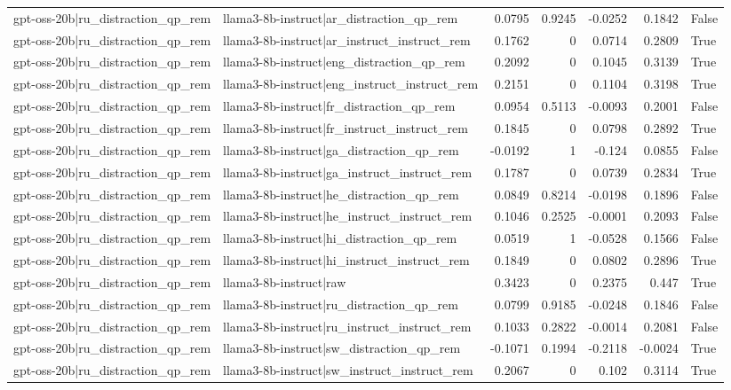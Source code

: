 \begin{table}
\begin{tabular}{l l r r r r l}
gpt-oss-20b|ru_distraction_qp_rem & llama3-8b-instruct|ar_distraction_qp_rem & 0.0795 & 0.9245 & -0.0252 & 0.1842 & False \\
gpt-oss-20b|ru_distraction_qp_rem & llama3-8b-instruct|ar_instruct_instruct_rem & 0.1762 & 0 & 0.0714 & 0.2809 & True \\
gpt-oss-20b|ru_distraction_qp_rem & llama3-8b-instruct|eng_distraction_qp_rem & 0.2092 & 0 & 0.1045 & 0.3139 & True \\
gpt-oss-20b|ru_distraction_qp_rem & llama3-8b-instruct|eng_instruct_instruct_rem & 0.2151 & 0 & 0.1104 & 0.3198 & True \\
gpt-oss-20b|ru_distraction_qp_rem & llama3-8b-instruct|fr_distraction_qp_rem & 0.0954 & 0.5113 & -0.0093 & 0.2001 & False \\
gpt-oss-20b|ru_distraction_qp_rem & llama3-8b-instruct|fr_instruct_instruct_rem & 0.1845 & 0 & 0.0798 & 0.2892 & True \\
gpt-oss-20b|ru_distraction_qp_rem & llama3-8b-instruct|ga_distraction_qp_rem & -0.0192 & 1 & -0.124 & 0.0855 & False \\
gpt-oss-20b|ru_distraction_qp_rem & llama3-8b-instruct|ga_instruct_instruct_rem & 0.1787 & 0 & 0.0739 & 0.2834 & True \\
gpt-oss-20b|ru_distraction_qp_rem & llama3-8b-instruct|he_distraction_qp_rem & 0.0849 & 0.8214 & -0.0198 & 0.1896 & False \\
gpt-oss-20b|ru_distraction_qp_rem & llama3-8b-instruct|he_instruct_instruct_rem & 0.1046 & 0.2525 & -0.0001 & 0.2093 & False \\
gpt-oss-20b|ru_distraction_qp_rem & llama3-8b-instruct|hi_distraction_qp_rem & 0.0519 & 1 & -0.0528 & 0.1566 & False \\
gpt-oss-20b|ru_distraction_qp_rem & llama3-8b-instruct|hi_instruct_instruct_rem & 0.1849 & 0 & 0.0802 & 0.2896 & True \\
gpt-oss-20b|ru_distraction_qp_rem & llama3-8b-instruct|raw & 0.3423 & 0 & 0.2375 & 0.447 & True \\
gpt-oss-20b|ru_distraction_qp_rem & llama3-8b-instruct|ru_distraction_qp_rem & 0.0799 & 0.9185 & -0.0248 & 0.1846 & False \\
gpt-oss-20b|ru_distraction_qp_rem & llama3-8b-instruct|ru_instruct_instruct_rem & 0.1033 & 0.2822 & -0.0014 & 0.2081 & False \\
gpt-oss-20b|ru_distraction_qp_rem & llama3-8b-instruct|sw_distraction_qp_rem & -0.1071 & 0.1994 & -0.2118 & -0.0024 & True \\
gpt-oss-20b|ru_distraction_qp_rem & llama3-8b-instruct|sw_instruct_instruct_rem & 0.2067 & 0 & 0.102 & 0.3114 & True \\

\end{tabular}
\end{table}
